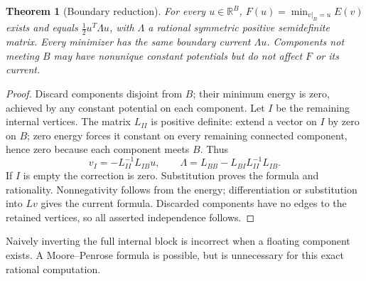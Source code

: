 \documentclass[11pt]{article}
\newtheorem{theorem}{Theorem}\newtheorem{proposition}[theorem]{Proposition}
\begin{document}
\begin{theorem}[Boundary reduction]
For every $u\in\mathbb R^B$, $F(u)=\min_{v|_B=u}E(v)$ exists and equals $\frac12u^T\Lambda u$, with $\Lambda$ a rational symmetric positive semidefinite matrix. Every minimizer has the same boundary current $\Lambda u$. Components not meeting $B$ may have nonunique constant potentials but do not affect $F$ or its current.
\end{theorem}
\begin{proof}
Discard components disjoint from $B$; their minimum energy is zero, achieved by any constant potential on each component. Let $I$ be the remaining internal vertices. The matrix $L_{II}$ is positive definite: extend a vector on $I$ by zero on $B$; zero energy forces it constant on every remaining connected component, hence zero because each component meets $B$. Thus
\[v_I=-L_{II}^{-1}L_{IB}u,\qquad
\Lambda=L_{BB}-L_{BI}L_{II}^{-1}L_{IB}.\]
If $I$ is empty the correction is zero. Substitution proves the formula and rationality. Nonnegativity follows from the energy; differentiation or substitution into $Lv$ gives the current formula. Discarded components have no edges to the retained vertices, so all asserted independence follows.
\end{proof}
Naively inverting the full internal block is incorrect when a floating component exists. A Moore--Penrose formula is possible, but is unnecessary for this exact rational computation.
\end{document}
